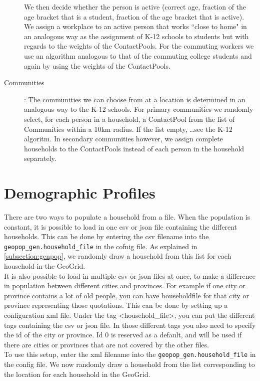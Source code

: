 \begin{description}
        We then decide whether the person is active (correct age, fraction of the age bracket that is a student,
        fraction of the age bracket that is active).
        We assign a workplace to an active person that works ``close to home"  in an 
        analogous way as the assignment of K-12 schools to students but with regards to the weights of the ContactPools.
        For the commuting workers we use an algorithm analogous to that of the commuting college students and again by
        using the weights of the ContactPools.
    \item[Communities]:
        The communities we can choose from at a location is determined in an analogous 
        way to the K-12 schools.
        For primary communities we randomly select, for each person in a household, a ContactPool 
        from the list of Communities within a 10km radius. If the list empty, \ldots see the K-12 algoritm.
        In secondary communities however, we assign complete households to the 
        ContactPools instead of each person in the household separately.
\end{description}
\section{Demographic Profiles}
\label{section:demographicprofiles}
There are two ways to populate a household from a file. When the population is constant, it is possible to load in one csv or json file containing the different households. This can be done by entering the csv filename into the \texttt{geopop\_gen.household\_file} in the cofnig file. As explained in \ref{subsection:genpop}, we randomly draw a household from this list for each household in the GeoGrid. \\
It is also possible to load in multiple csv or json files at once, to make a difference in population between different cities and provinces. For example if one city or province contains a lot of old people, you can have householdfile for that city or province representing those quotations. This can be done by setting up a configuration xml file. Under the tag \textless household\_file\textgreater, you can put the different tags containing the csv or json file. In those different tags you also need to specify the id of the city or province. Id 0 is reserved as a default, and will be used if there are cities or provinces that are not covered by the other files. \\
To use this setup, enter the xml filename into the \texttt{geopop\_gen.household\_file} in the config file. We now randomly draw a household from the list corresponding to the location for each household in the GeoGrid. 
